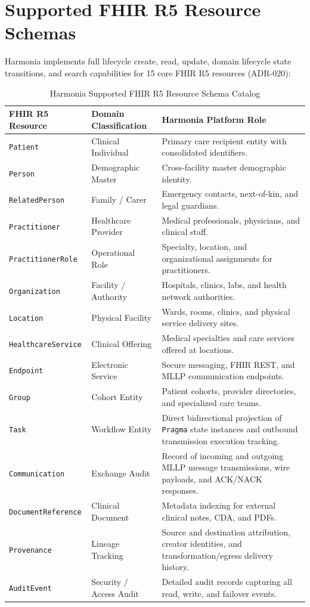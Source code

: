 \section{Supported FHIR R5 Resource Schemas}

Harmonia implements full lifecycle create, read, update, domain lifecycle state transitions, and search capabilities for 15 core FHIR R5 resources (ADR-020):

\begin{table}[htbp]
\centering
\small
\begin{tabularx}{\textwidth}{l p{4.0cm} X}
\toprule
\textbf{FHIR R5 Resource} & \textbf{Domain Classification} & \textbf{Harmonia Platform Role} \\
\midrule
\texttt{Patient} & Clinical Individual & Primary care recipient entity with consolidated identifiers. \\
\texttt{Person} & Demographic Master & Cross-facility master demographic identity. \\
\texttt{RelatedPerson} & Family / Carer & Emergency contacts, next-of-kin, and legal guardians. \\
\texttt{Practitioner} & Healthcare Provider & Medical professionals, physicians, and clinical staff. \\
\texttt{PractitionerRole} & Operational Role & Specialty, location, and organizational assignments for practitioners. \\
\texttt{Organization} & Facility / Authority & Hospitals, clinics, labs, and health network authorities. \\
\texttt{Location} & Physical Facility & Wards, rooms, clinics, and physical service delivery sites. \\
\texttt{HealthcareService} & Clinical Offering & Medical specialties and care services offered at locations. \\
\texttt{Endpoint} & Electronic Service & Secure messaging, FHIR REST, and MLLP communication endpoints. \\
\texttt{Group} & Cohort Entity & Patient cohorts, provider directories, and specialized care teams. \\
\texttt{Task} & Workflow Entity & Direct bidirectional projection of \texttt{Pragma} state instances and outbound transmission execution tracking. \\
\texttt{Communication} & Exchange Audit & Record of incoming and outgoing MLLP message transmissions, wire payloads, and ACK/NACK responses. \\
\texttt{DocumentReference} & Clinical Document & Metadata indexing for external clinical notes, CDA, and PDFs. \\
\texttt{Provenance} & Lineage Tracking & Source and destination attribution, creator identities, and transformation/egress delivery history. \\
\texttt{AuditEvent} & Security / Access Audit & Detailed audit records capturing all read, write, and failover events. \\
\bottomrule
\end{tabularx}
\caption{Harmonia Supported FHIR R5 Resource Schema Catalog}
\label{tab:fhir_resources}
\end{table}

